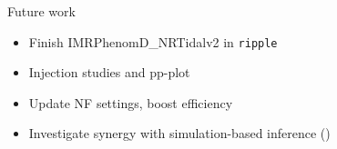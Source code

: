 \documentclass[usenames,dvipsnames,t]{beamer}
\begin{document}
\begin{frame}{Future work}

  \def\x{6mm}

  \vspace{4mm}

  \begin{itemize}
    \item Finish IMRPhenomD\_NRTidalv2 in \texttt{ripple}
    
    \vspace{\x}
    
    \item Injection studies and pp-plot
    
    \vspace{\x}

    \item Update NF settings, boost efficiency
    
    \vspace{\x}
    
    \item Investigate synergy with simulation-based inference ()
    
    
  \end{itemize}

\end{frame}
\end{document}
